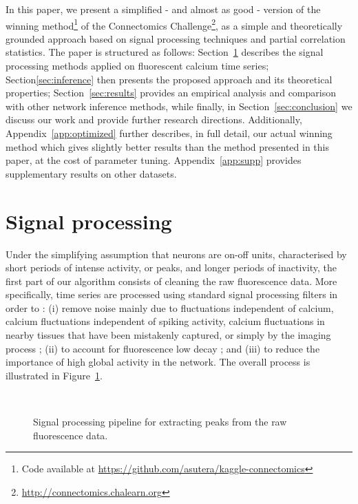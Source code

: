 \documentclass[wcp]{jmlr}
\begin{document}
In this paper, we present a simplified - and almost as good - version of the
winning method\footnote{Code available at \url{https://github.com/asutera/kaggle-connectomics}} of the Connectomics
Challenge\footnote{\url{http://connectomics.chalearn.org}}, as a simple and
theoretically grounded approach based on signal processing techniques and
partial correlation statistics. The paper is structured as follows:
Section~\ref{sec:filter} describes the signal processing methods applied on
fluorescent calcium time series; Section\ref{sec:inference} then presents the
proposed approach and its theoretical properties; Section~\ref{sec:results}
provides an empirical analysis and comparison with other network inference
methods, while finally, in Section~\ref{sec:conclusion} we discuss our work and
provide further research directions. Additionally,
Appendix~\ref{app:optimized} further describes, in full detail, our actual
winning method which gives slightly better results than the method presented in
this paper, at the cost of parameter tuning. Appendix~\ref{app:supp} provides supplementary results on other datasets.

\section{Signal processing} \label{sec:filter}

Under the simplifying assumption that neurons are on-off units, characterised
by short periods of intense activity, or peaks, and longer periods of
inactivity, the first part of our algorithm consists of cleaning the raw
fluorescence data.
More specifically, time series are processed using standard
signal processing filters in order to : (i) remove noise mainly due to fluctuations independent of calcium, calcium fluctuations independent of spiking activity, calcium fluctuations in nearby tissues that have been mistakenly captured, or simply by the imaging process ; (ii) to account for fluorescence low decay ; and (iii) to reduce the importance of
high global activity in the network. The overall process is illustrated in
Figure~\ref{fig:filtered-signal}.

\begin{figure}
\centering
{}
\\
\caption{Signal processing pipeline for extracting peaks from the raw fluorescence data.}
\label{fig:filtered-signal}
\end{figure}
\end{document}
